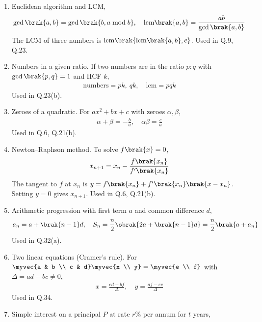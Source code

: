 \begin{enumerate}[label=\thesubsection.\arabic*, ref=\thesubsection.\theenumi]
\begin{align}
\end{align}
Used in Q.11.
\item Euclidean algorithm and LCM,
\begin{align}
	\gcd\brak{a,b} = \gcd\brak{b, a \bmod b}, \quad \text{lcm}\brak{a,b} = \frac{ab}{\gcd\brak{a,b}} \label{eq:CBSE25S2-euclid}
\end{align}
The LCM of three numbers is $\text{lcm}\brak{\text{lcm}\brak{a,b},c}$. Used in Q.9, Q.23.
\item Numbers in a given ratio. If two numbers are in the ratio $p:q$ with $\gcd\brak{p,q} = 1$ and HCF $k$,
\begin{align}
	\text{numbers} = pk,\ qk, \quad \text{lcm} = pqk \label{eq:CBSE25S2-ratio-hcf}
\end{align}
Used in Q.23(b).
\item Zeroes of a quadratic. For $ax^2 + bx + c$ with zeroes $\alpha, \beta$,
\begin{align}
	\alpha + \beta = -\frac{b}{a}, \quad \alpha\beta = \frac{c}{a} \label{eq:CBSE25S2-zeroes}
\end{align}
Used in Q.6, Q.21(b).
\item Newton--Raphson method. To solve $f\brak{x} = 0$,
\begin{align}
	x_{n+1} = x_n - \frac{f\brak{x_n}}{f^{\prime}\brak{x_n}} \label{eq:CBSE25S2-newton}
\end{align}
\solution
The tangent to $f$ at $x_n$ is $y = f\brak{x_n} + f^{\prime}\brak{x_n}\brak{x - x_n}$. Setting $y = 0$ gives $x_{n+1}$. Used in Q.6, Q.21(b).
\item Arithmetic progression with first term $a$ and common difference $d$,
\begin{align}
	a_n = a + \brak{n-1}d, \quad S_n = \frac{n}{2}\sbrak{2a + \brak{n-1}d} = \frac{n}{2}\brak{a + a_n} \label{eq:CBSE25S2-ap}
\end{align}
Used in Q.32(a).
\item Two linear equations (Cramer's rule). For $\myvec{a & b \\ c & d}\myvec{x \\ y} = \myvec{e \\ f}$ with $\Delta = ad - bc \neq 0$,
\begin{align}
	x = \frac{ed - bf}{\Delta}, \quad y = \frac{af - ec}{\Delta} \label{eq:CBSE25S2-cramer}
\end{align}
Used in Q.34.
\item Simple interest on a principal $P$ at rate $r\%$ per annum for $t$ years,

\end{enumerate}
